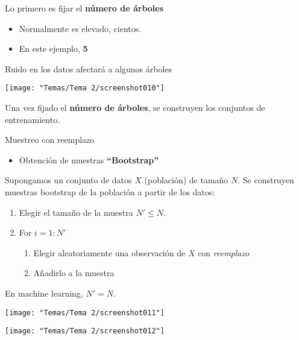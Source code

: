 \begin{minipage}{0.5\textwidth}
	Lo primero es fijar el \textbf{número de árboles}
	\begin{itemize}
		\item Normalmente es elevado, cientos.
	\item En este ejemplo, \textbf{5}
	\end{itemize}
	
	\hspace{2cm}
	
	Ruido en los datos afectará a algunos árboles
\end{minipage}\quad\begin{minipage}{0.5\textwidth}
\begin{center}
	\texttt{[image: "Temas/Tema 2/screenshot010"]}
\end{center}
\end{minipage}
\begin{minipage}{0.5\textwidth}
\begin{center}
Una vez fijado el \textbf{número de árboles}, se construyen los conjuntos de entrenamiento.
	
	
	{\Large {}}
	
	Muestreo con reemplazo
\end{center}
\begin{itemize}[label=\color{red}\textbullet, leftmargin=*]
	\item \color{lightblue}Obtención de muestras \textbf{“Bootstrap”}
\end{itemize}

Supongamos un conjunto de datos $X$ (población) de tamaño $N$.
Se construyen muestras bootstrap de la población a partir de los datos:
\begin{enumerate}[label=\color{lightblue}\arabic*)]
	\item Elegir el tamaño de la muestra $N'\le N$.
	\item For $i=1:N'$
	\begin{enumerate}[label=\color{lightblue}\arabic*)]
		\item Elegir aleatoriamente una observación de $X$ con \textit{reemplazo}
		\item Añadirlo a la muestra
	\end{enumerate}
\end{enumerate}
En machine learning, $N'=N$.
\end{minipage}\qquad\begin{minipage}{0.45\textwidth}
\begin{center}
	\texttt{[image: "Temas/Tema 2/screenshot011"]}
\end{center}
\end{minipage}
\begin{center}
	\texttt{[image: "Temas/Tema 2/screenshot012"]}
\end{center}

